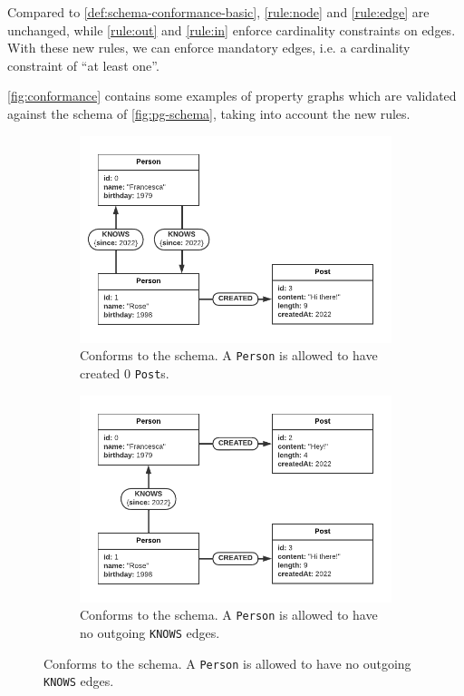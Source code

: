 \documentclass{report}
\theoremstyle{definition}
\begin{document}
Compared to \autoref{def:schema-conformance-basic}, \autoref{rule:node} and \ref{rule:edge} are unchanged, while \autoref{rule:out} and \ref{rule:in} enforce cardinality constraints on edges. With these new rules, we can enforce mandatory edges, i.e. a cardinality constraint of ``at least one''.

\autoref{fig:conformance} contains some examples of property graphs which are validated against the schema of \autoref{fig:pg-schema}, taking into account the new rules.

\begin{figure}[t]
  \centering
  \begin{subfigure}[t]{0.45\textwidth}
    \centering
    \includegraphics[width=\textwidth]{figures/conformance-out.pdf}
    \caption{Conforms to the schema. A \texttt{Person} is allowed to have created 0 \texttt{Post}s.}
    \label{fig:conformance-node}
  \end{subfigure}
  \hfill
  \begin{subfigure}[t]{0.45\textwidth}
    \centering
    \includegraphics[width=\textwidth]{figures/conformance-out-2.pdf}
    \caption{Conforms to the schema. A \texttt{Person} is allowed to have no outgoing \texttt{KNOWS} edges.}
    \label{fig:conformance-edge}
  \end{subfigure}


\end{figure}
\end{document}
